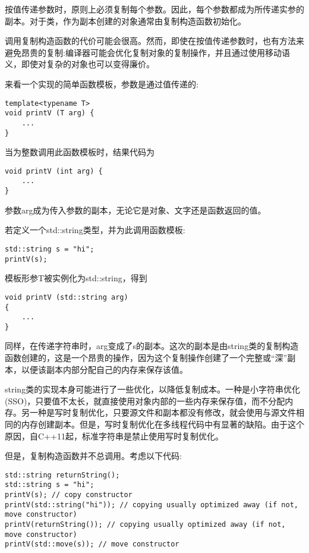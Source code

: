 按值传递参数时，原则上必须复制每个参数。因此，每个参数都成为所传递实参的副本。对于类，作为副本创建的对象通常由复制构造函数初始化。

调用复制构造函数的代价可能会很高。然而，即使在按值传递参数时，也有方法来避免昂贵的复制:编译器可能会优化复制对象的复制操作，并且通过使用移动语义，即使对复杂的对象也可以变得廉价。

来看一个实现的简单函数模板，参数是通过值传递的:

\begin{lstlisting}[style=styleCXX]
template<typename T>
void printV (T arg) {
	...
}
\end{lstlisting}

当为整数调用此函数模板时，结果代码为

\begin{lstlisting}[style=styleCXX]
void printV (int arg) {
	...
}
\end{lstlisting}

参数arg成为传入参数的副本，无论它是对象、文字还是函数返回的值。

若定义一个std::string类型，并为此调用函数模板:

\begin{lstlisting}[style=styleCXX]
std::string s = "hi";
printV(s);
\end{lstlisting}

模板形参T被实例化为std::string，得到

\begin{lstlisting}[style=styleCXX]
void printV (std::string arg)
{
	...
}
\end{lstlisting}

同样，在传递字符串时，arg变成了s的副本。这次的副本是由string类的复制构造函数创建的，这是一个昂贵的操作，因为这个复制操作创建了一个完整或“深”副本，以便该副本内部分配自己的内存来保存该值。

\begin{tcolorbox}[colback=webgreen!5!white,colframe=webgreen!75!black]
\hspace*{0.75cm}string类的实现本身可能进行了一些优化，以降低复制成本。一种是小字符串优化(SSO)，只要值不太长，就直接使用对象内部的一些内存来保存值，而不分配内存。另一种是写时复制优化，只要源文件和副本都没有修改，就会使用与源文件相同的内存创建副本。但是，写时复制优化在多线程代码中有显著的缺陷。由于这个原因，自C++11起，标准字符串是禁止使用写时复制优化。
\end{tcolorbox}

但是，复制构造函数并不总调用。考虑以下代码:

\begin{lstlisting}[style=styleCXX]
std::string returnString();
std::string s = "hi";
printV(s); // copy constructor
printV(std::string("hi")); // copying usually optimized away (if not, move constructor)
printV(returnString()); // copying usually optimized away (if not, move constructor)
printV(std::move(s)); // move constructor
\end{lstlisting}

